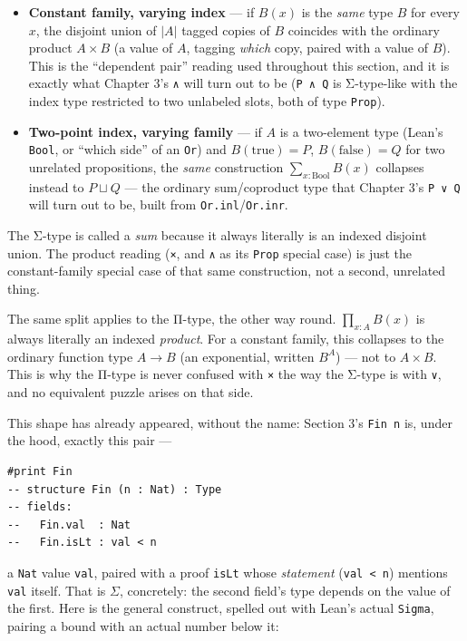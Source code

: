 \begin{itemize}
\tightlist
\item
  \textbf{Constant family, varying index} --- if \(B(x)\) is the \emph{same} type \(B\) for every \(x\), the disjoint union of \(|A|\) tagged copies of \(B\) coincides with the ordinary product \(A \times B\) (a value of \(A\), tagging \emph{which} copy, paired with a value of \(B\)). This is the ``dependent pair'' reading used throughout this section, and it is exactly what Chapter 3's \texttt{∧} will turn out to be (\texttt{P ∧ Q} is Σ-type-like with the index type restricted to two unlabeled slots, both of type \texttt{Prop}).
\item
  \textbf{Two-point index, varying family} --- if \(A\) is a two-element type (Lean's \texttt{Bool}, or ``which side'' of an \texttt{Or}) and \(B(\mathrm{true}) = P\), \(B(\mathrm{false}) = Q\) for two unrelated propositions, the \emph{same} construction \(\sum_{x:\mathrm{Bool}} B(x)\) collapses instead to \(P \sqcup Q\) --- the ordinary sum/coproduct type that Chapter 3's \texttt{P ∨ Q} will turn out to be, built from \texttt{Or.inl}/\texttt{Or.inr}.
\end{itemize}

The Σ-type is called a \emph{sum} because it always literally is an indexed disjoint union. The product reading (\texttt{×}, and \texttt{∧} as its \texttt{Prop} special case) is just the constant-family special case of that same construction, not a second, unrelated thing.

The same split applies to the Π-type, the other way round. \(\prod_{x:A} B(x)\) is always literally an indexed \emph{product}. For a constant family, this collapses to the ordinary function type \(A \to B\) (an exponential, written \(B^A\)) --- not to \(A \times B\). This is why the Π-type is never confused with \texttt{×} the way the Σ-type is with \texttt{∨}, and no equivalent puzzle arises on that side.

This shape has already appeared, without the name: Section 3's \texttt{Fin n} is, under the hood, exactly this pair ---

\begin{lstlisting}
#print Fin
-- structure Fin (n : Nat) : Type
-- fields:
--   Fin.val  : Nat
--   Fin.isLt : val < n
\end{lstlisting}

a \texttt{Nat} value \texttt{val}, paired with a proof \texttt{isLt} whose \emph{statement} (\texttt{val < n}) mentions \texttt{val} itself. That is \(\Sigma\), concretely: the second field's type depends on the value of the first. Here is the general construct, spelled out with Lean's actual \texttt{Sigma}, pairing a bound with an actual number below it:

